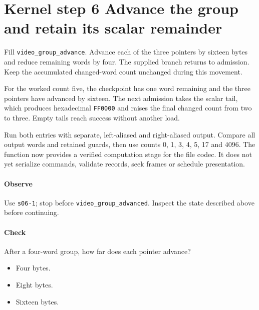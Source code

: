 \section{Kernel step 6 Advance the group and retain its scalar remainder}
Fill \texttt{video\_group\_advance}. Advance each of the three pointers by sixteen bytes and reduce remaining words by four. The supplied branch returns to admission. Keep the accumulated changed-word count unchanged during this movement.

For the worked count five, the checkpoint has one word remaining and the three pointers have advanced by sixteen. The next admission takes the scalar tail, which produces hexadecimal \texttt{FF0000} and raises the final changed count from two to three. Empty tails reach success without another load.

Run both entries with separate, left-aliased and right-aliased output. Compare all output words and retained guards, then use counts 0, 1, 3, 4, 5, 17 and 4096. The function now provides a verified computation stage for the file codec. It does not yet serialize commands, validate records, seek frames or schedule presentation.

\paragraph{Observe} Use \texttt{s06-1}; stop before \texttt{video\_group\_advanced}. Inspect the state described above before continuing.

\paragraph{Check} After a four-word group, how far does each pointer advance?
\begin{itemize}
  \item[A.] Four bytes.
  \item[B.] Eight bytes.
  \item[C.] Sixteen bytes.
\end{itemize}
